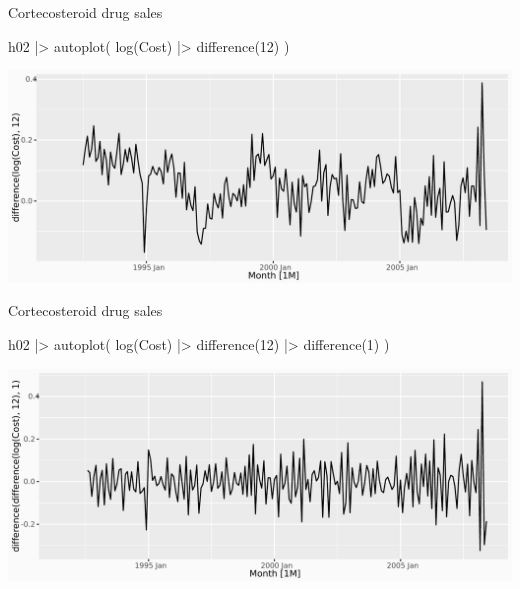 \documentclass[
  14pt,
  ignorenonframetext,
  aspectratio=169,
]{beamer}
\newenvironment{Shaded}{\begin{snugshade}}{\end{snugshade}}
\newcommand{\DecValTok}[1]{\textcolor[rgb]{0.00,0.00,0.81}{#1}}
\newcommand{\FunctionTok}[1]{\textcolor[rgb]{0.00,0.00,0.00}{#1}}
\newcommand{\NormalTok}[1]{\textcolor[rgb]{0.00,0.00,0.00}{#1}}
\newcommand{\SpecialCharTok}[1]{\textcolor[rgb]{0.00,0.00,0.00}{#1}}
\renewenvironment{Shaded}{\vspace*{0.15cm}\color{black}\fontsize{10}{10}\sf\begin{snugshade}\color{black}}{\end{snugshade}}
\begin{document}
\begin{frame}[fragile]{Cortecosteroid drug sales}
\protect\hypertarget{cortecosteroid-drug-sales-3}{}
\begin{Shaded}
\begin{Highlighting}[]
\NormalTok{h02 }\SpecialCharTok{|\textgreater{}} \FunctionTok{autoplot}\NormalTok{(}
  \FunctionTok{log}\NormalTok{(Cost) }\SpecialCharTok{|\textgreater{}} \FunctionTok{difference}\NormalTok{(}\DecValTok{12}\NormalTok{)}
\NormalTok{)}
\end{Highlighting}
\end{Shaded}

\includegraphics{04_arima_files/figure-beamer/unnamed-chunk-7-1.pdf}
\end{frame}

\begin{frame}[fragile]{Cortecosteroid drug sales}
\protect\hypertarget{cortecosteroid-drug-sales-4}{}
\begin{Shaded}
\begin{Highlighting}[]
\NormalTok{h02 }\SpecialCharTok{|\textgreater{}} \FunctionTok{autoplot}\NormalTok{(}
  \FunctionTok{log}\NormalTok{(Cost) }\SpecialCharTok{|\textgreater{}} \FunctionTok{difference}\NormalTok{(}\DecValTok{12}\NormalTok{) }\SpecialCharTok{|\textgreater{}} \FunctionTok{difference}\NormalTok{(}\DecValTok{1}\NormalTok{)}
\NormalTok{)}
\end{Highlighting}
\end{Shaded}

\includegraphics{04_arima_files/figure-beamer/unnamed-chunk-8-1.pdf}
\end{frame}
\end{document}
